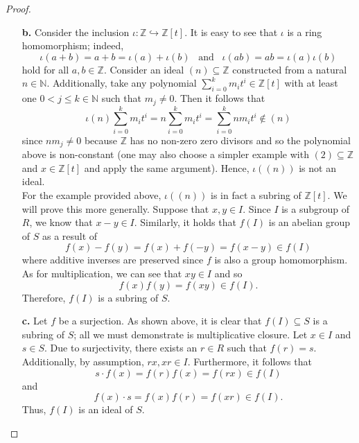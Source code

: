 \documentclass[ 12pt ]{article}
\begin{document}
\begin{enumerate}
\begin{proof}
\begin{enumerate}
				\item[\textbf{b.}] Consider the inclusion $\iota : \mathbb{Z} \hookrightarrow \mathbb{Z}[t]$. It is easy to see that $\iota$ is a ring homomorphism; indeed, $$\iota(a + b) = a + b = \iota(a) + \iota(b)\;\;\; \mathrm{and}\;\;\; \iota(ab) = ab = \iota(a) \iota(b)$$ hold for all $a, b \in \mathbb{Z}$. Consider an ideal $(n) \subseteq \mathbb{Z}$ constructed from a natural $n \in \mathbb{N}$. Additionally, take any polynomial $\sum_{i = 0}^k m_i t^i \in \mathbb{Z}[t]$ with at least one $0 < j \leq k \in \mathbb{N}$ such that $m_j \neq 0$. Then it follows that $$\iota(n) \sum_{i = 0}^k m_i t^i = n \sum_{i = 0}^k m_i t^i = \sum_{i = 0}^k n m_i t^i \notin (n)$$ since $nm_j \neq 0$ because $\mathbb{Z}$ has no non-zero zero divisors and so the polynomial above is non-constant (one may also choose a simpler example with $(2) \subseteq \mathbb{Z}$ and $x \in \mathbb{Z}[t]$ and apply the same argument). Hence, $\iota((n))$ is not an ideal. \\

				For the example provided above, $\iota((n))$ is in fact a subring of $\mathbb{Z}[t]$. We will prove this more generally. Suppose that $x, y \in I$. Since $I$ is a subgroup of $R$, we know that $x - y \in I$. Similarly, it holds that $f(I)$ is an abelian group of $S$ as a result of $$f(x) - f(y) = f(x) + f(-y) = f(x - y) \in f(I)$$ where additive inverses are preserved since $f$ is also a group homomorphism. As for multiplication, we can see that $xy \in I$ and so $$f(x) f(y) = f(xy) \in f(I).$$ Therefore, $f(I)$ is a subring of $S$.

				\item[\textbf{c.}] Let $f$ be a surjection. As shown above, it is clear that $f(I) \subseteq S$ is a subring of $S$; all we must demonstrate is multiplicative closure. Let $x \in I$ and $s \in S$. Due to surjectivity, there exists an $r \in R$ such that $f(r) = s$. Additionally, by assumption, $rx, xr \in I$. Furthermore, it follows that $$s \cdot f(x) = f(r) f(x) = f(rx) \in f(I)$$ and $$f(x) \cdot s = f(x) f(r) = f(xr) \in f(I).$$ Thus, $f(I)$ is an ideal of $S$.
			\end{enumerate}
		\end{proof}


\end{enumerate}
\end{document}
